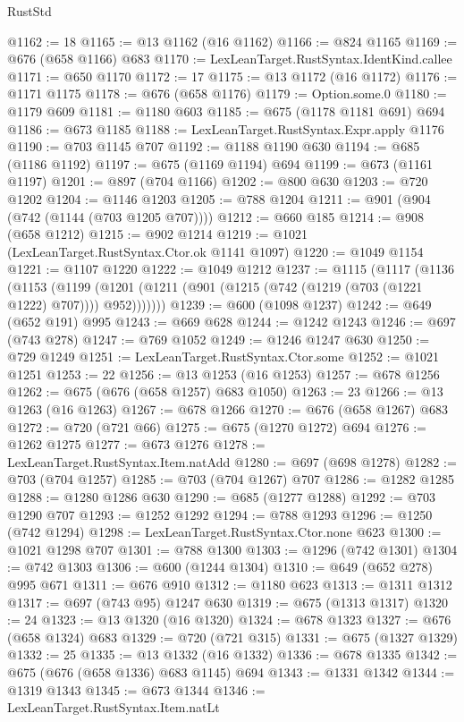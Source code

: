 \begin{lexlean}{RustStd}
\begin{coremodule}
{\begin{coremodule}
{{{{{{{{{{{{@1162 := 18
@1165 := @13 @1162 (@16 @1162)
@1166 := @824 @1165
@1169 := @676 (@658 @1166) @683
@1170 := LexLeanTarget.RustSyntax.IdentKind.callee
@1171 := @650 @1170
@1172 := 17
@1175 := @13 @1172 (@16 @1172)
@1176 := @1171 @1175
@1178 := @676 (@658 @1176)
@1179 := Option.some.{0}
@1180 := @1179 @609
@1181 := @1180 @603
@1185 := @675 (@1178 @1181 @691) @694
@1186 := @673 @1185
@1188 := LexLeanTarget.RustSyntax.Expr.apply @1176
@1190 := @703 @1145 @707
@1192 := @1188 @1190 @630
@1194 := @685 (@1186 @1192)
@1197 := @675 (@1169 @1194) @694
@1199 := @673 (@1161 @1197)
@1201 := @897 (@704 @1166)
@1202 := @800 @630
@1203 := @720 @1202
@1204 := @1146 @1203
@1205 := @788 @1204
@1211 := @901 (@904 (@742 (@1144 (@703 @1205 @707))))
@1212 := @660 @185
@1214 := @908 (@658 @1212)
@1215 := @902 @1214
@1219 := @1021 (LexLeanTarget.RustSyntax.Ctor.ok @1141 @1097)
@1220 := @1049 @1154
@1221 := @1107 @1220
@1222 := @1049 @1212
@1237 := @1115
    (@1117
      (@1136
        (@1153
          (@1199 (@1201 (@1211 (@901 (@1215 (@742 (@1219 (@703 (@1221 @1222) @707)))) @952)))))))
@1239 := @600 (@1098 @1237)
@1242 := @649 (@652 @191) @995
@1243 := @669 @628
@1244 := @1242 @1243
@1246 := @697 (@743 @278)
@1247 := @769 @1052
@1249 := @1246 @1247 @630
@1250 := @729 @1249
@1251 := LexLeanTarget.RustSyntax.Ctor.some
@1252 := @1021 @1251
@1253 := 22
@1256 := @13 @1253 (@16 @1253)
@1257 := @678 @1256
@1262 := @675 (@676 (@658 @1257) @683 @1050)
@1263 := 23
@1266 := @13 @1263 (@16 @1263)
@1267 := @678 @1266
@1270 := @676 (@658 @1267) @683
@1272 := @720 (@721 @66)
@1275 := @675 (@1270 @1272) @694
@1276 := @1262 @1275
@1277 := @673 @1276
@1278 := LexLeanTarget.RustSyntax.Item.natAdd
@1280 := @697 (@698 @1278)
@1282 := @703 (@704 @1257)
@1285 := @703 (@704 @1267) @707
@1286 := @1282 @1285
@1288 := @1280 @1286 @630
@1290 := @685 (@1277 @1288)
@1292 := @703 @1290 @707
@1293 := @1252 @1292
@1294 := @788 @1293
@1296 := @1250 (@742 @1294)
@1298 := LexLeanTarget.RustSyntax.Ctor.none @623
@1300 := @1021 @1298 @707
@1301 := @788 @1300
@1303 := @1296 (@742 @1301)
@1304 := @742 @1303
@1306 := @600 (@1244 @1304)
@1310 := @649 (@652 @278) @995 @671
@1311 := @676 @910
@1312 := @1180 @623
@1313 := @1311 @1312
@1317 := @697 (@743 @95) @1247 @630
@1319 := @675 (@1313 @1317)
@1320 := 24
@1323 := @13 @1320 (@16 @1320)
@1324 := @678 @1323
@1327 := @676 (@658 @1324) @683
@1329 := @720 (@721 @315)
@1331 := @675 (@1327 @1329)
@1332 := 25
@1335 := @13 @1332 (@16 @1332)
@1336 := @678 @1335
@1342 := @675 (@676 (@658 @1336) @683 @1145) @694
@1343 := @1331 @1342
@1344 := @1319 @1343
@1345 := @673 @1344
@1346 := LexLeanTarget.RustSyntax.Item.natLt
}}}}}}}}}}}}
\end{coremodule}}
\end{coremodule}
\end{lexlean}

